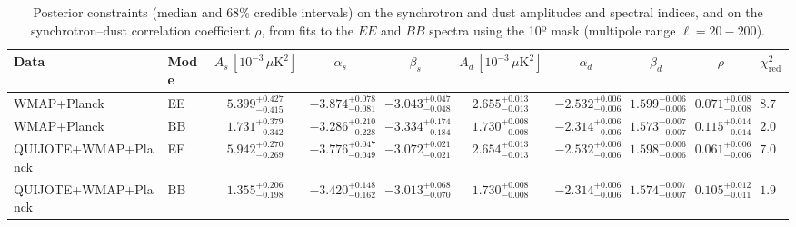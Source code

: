 \begin{table}[h]
\centering
\scriptsize
\setlength{\tabcolsep}{4pt}
\caption{Posterior constraints (median and $68\%$ credible intervals) on the synchrotron and dust amplitudes and spectral indices, and on the synchrotron--dust correlation coefficient $\rho$, from fits to the $EE$ and $BB$ spectra using the 10º mask (multipole range $\ell=20-200$).}
\label{tab:fit_no_QQ_autos_ell20-200}
\begin{tabular}{llcccccccc}
\toprule
Data & Mode & $A_s\,[10^{-3}\,\mu\mathrm{K}^2]$ & $\alpha_s$ & $\beta_s$ & $A_d\,[10^{-3}\,\mu\mathrm{K}^2]$ & $\alpha_d$ & $\beta_d$ & $\rho$ & $\chi^2_\mathrm{red}$ \\
\midrule
WMAP+Planck & EE & $5.399^{+0.427}_{-0.415}$ & $-3.874^{+0.078}_{-0.081}$ & $-3.043^{+0.047}_{-0.048}$ & $2.655^{+0.013}_{-0.013}$ & $-2.532^{+0.006}_{-0.006}$ & $1.599^{+0.006}_{-0.006}$ & $0.071^{+0.008}_{-0.008}$ & $8.77$ \\
WMAP+Planck & BB & $1.731^{+0.379}_{-0.342}$ & $-3.286^{+0.210}_{-0.228}$ & $-3.334^{+0.174}_{-0.184}$ & $1.730^{+0.008}_{-0.008}$ & $-2.314^{+0.006}_{-0.006}$ & $1.573^{+0.007}_{-0.007}$ & $0.115^{+0.014}_{-0.014}$ & $2.09$ \\
QUIJOTE+WMAP+Planck & EE & $5.942^{+0.270}_{-0.269}$ & $-3.776^{+0.047}_{-0.049}$ & $-3.072^{+0.021}_{-0.021}$ & $2.654^{+0.013}_{-0.013}$ & $-2.532^{+0.006}_{-0.006}$ & $1.598^{+0.006}_{-0.006}$ & $0.061^{+0.006}_{-0.006}$ & $7.00$ \\
QUIJOTE+WMAP+Planck & BB & $1.355^{+0.206}_{-0.198}$ & $-3.420^{+0.148}_{-0.162}$ & $-3.013^{+0.068}_{-0.070}$ & $1.730^{+0.008}_{-0.008}$ & $-2.314^{+0.006}_{-0.006}$ & $1.574^{+0.007}_{-0.007}$ & $0.105^{+0.012}_{-0.011}$ & $1.94$ \\
\bottomrule
\end{tabular}
\end{table}